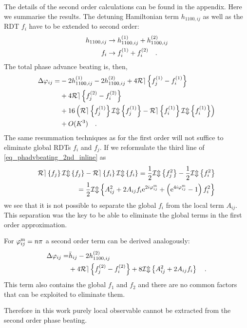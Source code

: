 The details of the second order calculations can be found in the appendix. Here we summarise the results.
The detuning Hamiltonian term $h_{1100,ij} $ as well as the RDT $f_{i} $ have to be extended to second order:
%
\begin{align}
  h_{1100,ij} &\rightarrow h_{1100,ij}^{(1)} + h_{1100,ij}^{(2)}\\
  f_{i} &\rightarrow f_{i}^{(1)} + f_{i}^{(2)}
  \quad .
  \label{eq_1st--2nd}
\end{align}
%
The total phase advance beating is, then,
%
\begin{align}
  \Delta\varphi_{ij} = &-2h_{1100,ij}^{(1)} 
  - 2h^{(2)}_{1100,ij}
  + 4\mathcal{Re} \left\{ f_j^{(1)} - f_i^{(1)} \right\} \notag\\
  &+ 4\mathcal{Re} \left\{ f_j^{(2)} - f_i^{(2)} \right\}\notag \\
  &+ 16 \left( \mathcal{Re} \left\{ f_j^{(1)} \right\} \mathcal{Im} \left\{ f_j^{(1)} \right\} - \mathcal{Re} \left\{ f_i^{(1)} \right\} \mathcal{Im} \left\{ f_i^{(1)} \right\} \right)\notag\\
  &+ O(K^{3})
  \quad .
  \label{eq_phadvbeating_2nd_inline}
\end{align}
%
The same resummation techniques as for the first order will not suffice to eliminate
global RDTs $f_i$ and $f_j$.
If we reformulate the third line of \eqref{eq_phadvbeating_2nd_inline} as
%
\begin{align}
   \mathcal{Re} \left\{ f_j \right\} \mathcal{Im} \left\{ f_j \right\} - \mathcal{Re} \left\{ f_i \right\} \mathcal{Im} \left\{ f_i \right\}  = 
   \frac{1}{2}\mathcal{Im} \left\{ f_j^2 \right\} - \frac{1}{2}\mathcal{Im} \left\{ f_i^2 \right\} \notag \\
    = \frac{1}{2} \mathcal{Im} \left\{  
     A_{ij}^2 + 2A_{ij}f_i\text{e}^{2i\varphi_{ij}^\text{m}} + 
     \left( \text{e}^{4i\varphi_{ij}^\text{m}} - 1 \right) f_{i}^2 \right\}
  \label{eq_expanding2ndorder}
\end{align}
%
we see that it is not possible to separate the global $f_i$ from the local term $A_{ij}$. This
separation was the key to be able to eliminate the global terms in the first order approximation.

For $\varphi_{ij}^\text{m} = n\pi$ a second order term can be derived analogously:
%
\begin{align}
  \Delta\varphi_{ij} = & \bar{h}_{ij} - 2h_{1100,ij}^{(2)} \notag \\
  &+ 4\mathcal{Re} \left\{ f_j^{(2)}-f_i^{(2)} \right\} + 8\mathcal{Im} \left\{ A_{ij}^{2}+ 2A_{ij}f_i \right\}
  \quad .
  \label{eq_npi_second}
\end{align}
%
This term also contains the global $f_1$ and $f_2$ and there are no common factors that can be exploited
to eliminate them.

Therefore in this work purely local observable cannot be extracted from the second order phase beating.

